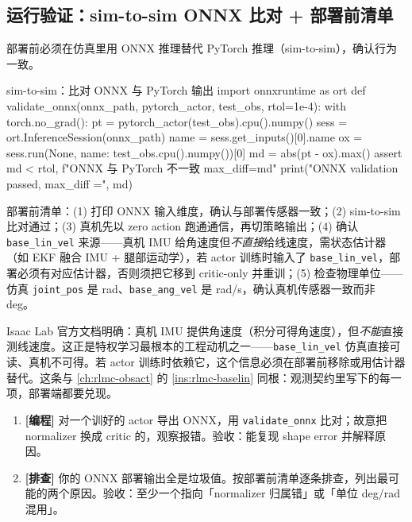 \subsection{运行验证：sim-to-sim ONNX 比对 + 部署前清单}
\label{sec:rlmc-priv-sim2sim}

部署前必须在仿真里用 ONNX 推理替代 PyTorch 推理（sim-to-sim），确认行为一致。

\begin{codebox}[Python]{sim-to-sim：比对 ONNX 与 PyTorch 输出}
import onnxruntime as ort
def validate_onnx(onnx_path, pytorch_actor, test_obs, rtol=1e-4):
    with torch.no_grad():
        pt = pytorch_actor(test_obs).cpu().numpy()
    sess = ort.InferenceSession(onnx_path)
    name = sess.get_inputs()[0].name
    ox = sess.run(None, {name: test_obs.cpu().numpy()})[0]
    md = abs(pt - ox).max()
    assert md < rtol, f"ONNX 与 PyTorch 不一致 max_diff={md}"
    print("ONNX validation passed, max_diff =", md)
\end{codebox}

部署前清单：(1) 打印 ONNX 输入维度，确认与部署传感器一致；(2) sim-to-sim 比对通过；(3) 真机先以 zero action 跑通通信，再切策略输出；(4) 确认 \verb|base_lin_vel| 来源——真机 IMU 给角速度但\emph{不直接}给线速度，需状态估计器（如 EKF 融合 IMU + 腿部运动学），若 actor 训练时输入了 \verb|base_lin_vel|，部署必须有对应估计器，否则须把它移到 critic-only 并重训；(5) 检查物理单位——仿真 \verb|joint_pos| 是 rad、\verb|base_ang_vel| 是 rad/s，确认真机传感器一致而非 deg。

\begin{insight}\label{ins:rlmc-priv-baselin}
Isaac Lab 官方文档明确：真机 IMU 提供角速度（积分可得角速度），但\emph{不能}直接测线速度。这正是特权学习最根本的工程动机之一——\verb|base_lin_vel| 仿真直接可读、真机不可得。若 actor 训练时依赖它，这个信息必须在部署前移除或用估计器替代。这条与 \cref{ch:rlmc-obsact} 的 \cref{ins:rlmc-baselin} 同根：观测契约里写下的每一项，部署端都要兑现。
\end{insight}

\begin{practice}[本节练习]
\begin{enumerate}
  \item \textbf{[编程]} 对一个训好的 actor 导出 ONNX，用 \verb|validate_onnx| 比对；故意把 normalizer 换成 critic 的，观察报错。验收：能复现 shape error 并解释原因。
  \item \textbf{[排查]} 你的 ONNX 部署输出全是垃圾值。按部署前清单逐条排查，列出最可能的两个原因。验收：至少一个指向「normalizer 归属错」或「单位 deg/rad 混用」。
\end{enumerate}
\end{practice}

